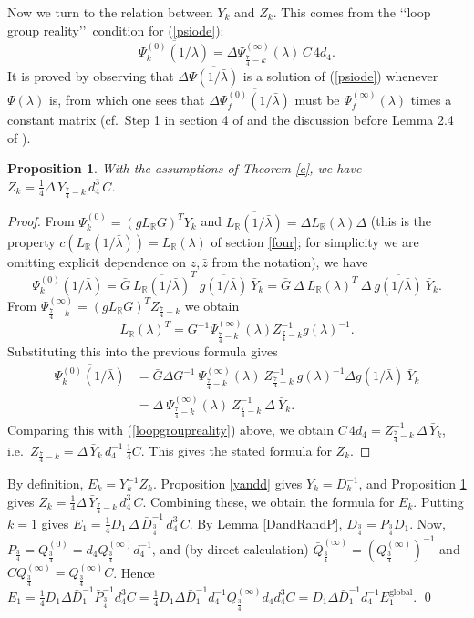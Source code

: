 \documentclass[a4paper,12pt,leqno]{amsart}
\numberwithin{equation}{section}
\theoremstyle{plain}
\newtheorem{proposition}[theorem]{Proposition}
\theoremstyle{definition}
\newcommand{\R}{\mathbb R}
\newcommand{\la}{\lambda}
\newcommand{\De}{\Delta}
\newcommand{\no}{\noindent}
\renewcommand{\ll}{\lq\lq}
\newcommand{\rr}{\rq\rq\ }
\newcommand{\zbar}{  {\bar z}  }
\newcommand{\Psiz}{  \Psi^{(0)}  }
\newcommand{\Psii}{  \Psi^{(\infty)}  }
\newcommand{\Qz}{  Q^{(0)}  }
\newcommand{\Qi}{  Q^{(\infty)}  }
\newcommand{\barQi}{  {\bar Q}^{(\infty)}  }
\begin{document}
Now we turn to the relation between $Y_k$ and $Z_k$.  This comes from the \ll loop group reality\rr condition for (\ref{psiode}):
\begin{equation}\label{loopgroupreality}
\overline{\Psiz_k(1/\bar\la)}=\De \Psii_{\frac74-k}(\la) \, C \, 4d_4.
\end{equation}
It is proved by observing that $\De \overline{\Psi(1/\bar\la)}$ is a solution of (\ref{psiode}) whenever $\Psi(\la)$ is, from which one sees that $\De \overline{\Psiz_f(1/\bar\la)}$ must be  $\Psii_f(\la)$ times a constant matrix
(cf.\ Step 1 in section 4 of \cite{GuItLiXX}
and the discussion before Lemma 2.4 of \cite{GuItLi15}). 

\begin{proposition}\label{yandz}
With the assumptions of Theorem \ref{e}, we have
$Z_k= \tfrac14 \De\, \bar Y_{\frac74-k}\, d_4^3\, C$.
\end{proposition} 

\begin{proof}  From $\Psiz_k=(g L_\R G)^T Y_k$ and 
$\overline{L_\R(1/\bar\la)} = \De L_\R(\la) \De$
(this is the property $c(L_\R(1/{\bar\la}))=L_\R(\la)$ of section \ref{four}; for simplicity we are omitting explicit dependence on $z,\zbar$ from the notation),
we have
\[
\overline{\Psiz_k(1/\bar\la)} =
\bar G \ \overline{L_\R(1/\bar\la)}^T  \ \overline{g(1/\bar\la)} \ \bar Y_k
= \bar G \ \De\  L_\R(\la)^T \ \De  \  \overline{g(1/\bar\la)} \  \bar Y_k.
\]
\no From $\Psii_{\frac74-k}=(g L_\R G)^T Z_{\frac74-k}$ we obtain 
\[
L_\R(\la)^T = G^{-1} \Psii_{\frac74-k}(\la) Z_{\frac74-k}^{-1} g(\la)^{-1}.
\]  
Substituting this into the previous formula gives
\begin{align*}
\overline{\Psiz_k(1/\bar\la)} 
&= 
\bar G \De G^{-1} \ \Psii_{\frac74-k}(\la) \ Z_{\frac74-k}^{-1} \ g(\la)^{-1} \De 
\overline{g(1/\bar\la)} \  \bar Y_k
\\
&=\De \ \Psii_{\frac74-k}(\la) \ Z_{\frac74-k}^{-1} \ \De \  \bar Y_k.
\end{align*}
Comparing this with (\ref{loopgroupreality}) above, 
we obtain
$C\,4d_4 =  Z_{\frac74-k}^{-1} \, \De \, \bar Y_k$, i.e.\
$Z_{\frac74-k} = \De \, \bar Y_k \, d_4^{-1} \, \tfrac14 C$.  This gives the stated formula for $Z_k$.
\end{proof}

\no{\em Proof of Theorem \ref{e}.\ \ }  By definition, $E_k=Y_k^{-1}Z_k$.
Proposition \ref{yandd} gives
$Y_k=D_k^{-1}$, and Proposition \ref{yandz} gives
$Z_k= \tfrac14 \De\, \bar Y_{\frac74-k}\, d_4^3\, C$.  Combining these, we obtain the formula for $E_k$.  Putting $k=1$ gives
$E_1=\tfrac14 D_1\, \De\, \bar D_{\frac34}^{-1}\, d_4^3\,  C$.  
By Lemma \ref{DandRandP}, $D_{\frac34}=P_{\frac34} D_1$.  
Now, $P_{\frac34} = \Qz_{\frac34} = d_4 \Qi_{\frac34} d_4^{-1}$,
and (by direct calculation) $\barQi_{\frac34} = (\Qi_{\frac34})^{-1}$
and $C \Qi_{\frac34} = \Qi_{\frac34} C$.  Hence
$E_1=\tfrac14 D_1 \De \bar D_1^{-1} \bar P_{\frac34}^{-1}    d_4^3  C
=\tfrac14 D_1 \De \bar D_1^{-1} d_4^{-1} \Qi_{\frac34} d_4    d_4^3  C
= D_1 \De \bar D_1^{-1} d_4^{-1} E_1^{\text{global}}$.
\qed
\end{document}
